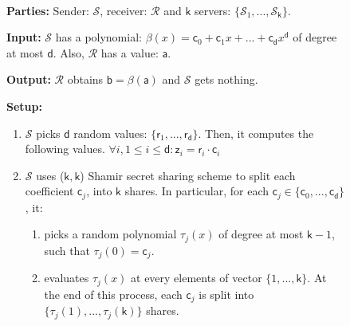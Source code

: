 \begin{figure}[ht]
\setlength{\fboxsep}{2pt}
\begin{center}
\begin{boxedminipage}{11cm}
\small{

\

\noindent\textbf {Parties:} Sender: $\mathcal{S}$, receiver: $\mathcal{R}$ and $\mathsf{k}$ servers: $\{\mathcal{S}_{\scriptscriptstyle {1}},...,\mathcal{S}_{\scriptscriptstyle \mathsf{k}}\}$.

\noindent\textbf {Input:} $\mathcal{S}$ has a polynomial: $\beta(x)=\mathsf{c}_{\scriptscriptstyle 0}+\mathsf{c}_{\scriptscriptstyle 1}x+...+\mathsf{c}_{\scriptscriptstyle \mathsf{d}}x^{\scriptscriptstyle \mathsf{d}}$  of degree at most $\mathsf{d}$. Also, $\mathcal{R}$ has a value:  $\mathsf{a}$.

\noindent\textbf {Output:} $\mathcal{R}$ obtains $\mathsf{b}=\beta(\mathsf{a})$ and $\mathcal{S}$ gets nothing.

\noindent\textbf {Setup:} 
\begin{enumerate}
\item $\mathcal{S}$ picks $\mathsf{d}$ random values: $\{\mathsf{r}_{\scriptscriptstyle 1},...,\mathsf{r}_{\scriptscriptstyle \mathsf{d}}\}$. Then, it computes the following values. $\forall i,1\leq i \leq \mathsf{d}: \mathsf{z}_{\scriptscriptstyle i}=\mathsf{r}_{\scriptscriptstyle i}\cdot \mathsf{c}_{\scriptscriptstyle i}$


\item $\mathcal{S}$  uses ($\mathsf{k},\mathsf{k}$) Shamir secret sharing scheme to split each coefficient $\mathsf{c}_{\scriptscriptstyle j}$,  into $\mathsf{k}$ shares.  In particular, for each $\mathsf{c}_{\scriptscriptstyle j} \in \{\mathsf{c}_{\scriptscriptstyle 0},...,\mathsf{c}_{\scriptscriptstyle \mathsf{d}}\}$, it:

\begin{enumerate}
\item picks a random polynomial $\tau_{\scriptscriptstyle j}(x)$ of degree at most $\mathsf{k}-1$, such that $\tau_{\scriptscriptstyle j}(0)=\mathsf{c}_{\scriptscriptstyle j}$. 
\item evaluates $\tau_{\scriptscriptstyle j}(x)$ at every elements of  vector $\{1,...,\mathsf{k}\}$.  At the end of this process, each $\mathsf{c}_{\scriptscriptstyle j}$ is split into $\{ \tau_{\scriptscriptstyle j}(1),..., \tau_{\scriptscriptstyle j}(\mathsf{k})\}$ shares. 




\end{enumerate}
\end{enumerate}}
\end{boxedminipage}
\end{center}
\end{figure}
